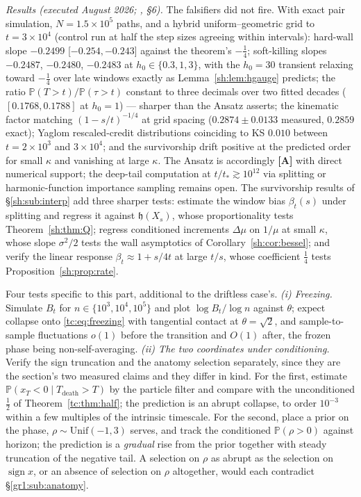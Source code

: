 \documentclass[11pt]{article}
\numberwithin{equation}{section}
\theoremstyle{plain}
\theoremstyle{definition}
\theoremstyle{remark}
\newcommand{\PP}{\mathbb{P}}
\newcommand{\hm}{\mathfrak{h}}
\begin{document}
\emph{Results (executed August 2026; \cite{Ben26Extract}, \S6).} The
falsifiers did not fire. With exact pair simulation,
$N=1.5\times10^{5}$ paths, and a hybrid uniform--geometric grid to
$t=3\times10^{4}$ (control run at half the step sizes agreeing within
intervals): hard-wall slope $-0.2499$ [$-0.254,-0.243$] against the
theorem's $-\tfrac14$; soft-killing slopes $-0.2487$, $-0.2480$,
$-0.2483$ at $h_0\in\{0.3,1,3\}$, with the $h_0=30$ transient
relaxing toward $-\tfrac14$ over late windows exactly as
Lemma~\ref{sh:lem:hgauge} predicts; the ratio
$\PP(T>t)/\PP(\tau>t)$ constant to three decimals over two fitted
decades ($[0.1768,0.1788]$ at $h_0=1$) --- sharper than the Ansatz
asserts; the kinematic factor matching $(1-s/t)^{-1/4}$ at grid
spacing ($0.2874\pm0.0133$ measured, $0.2859$ exact); Yaglom
rescaled-credit distributions coinciding to KS $0.010$ between
$t=2\times10^{3}$ and $3\times10^{4}$; and the survivorship drift
positive at the predicted order for small $\kappa$ and vanishing at
large $\kappa$. The Ansatz is accordingly \textbf{[A]} with direct
numerical support; the deep-tail computation at
$t/t_*\gtrsim10^{12}$ via splitting or harmonic-function importance
sampling remains open. The survivorship results of
\S\ref{sh:sub:interp} add three sharper tests: estimate the window bias
$\beta_t(s)$ under splitting and regress it against $\hm(X_s)$, whose
proportionality tests Theorem~\ref{sh:thm:Q}; regress conditioned
increments $\Delta\mu$ on $1/\mu$ at small $\kappa$, whose slope
$\sigma^2/2$ tests the wall asymptotics of
Corollary~\ref{sh:cor:bessel}; and verify the linear response
$\beta_t\approx1+s/4t$ at large $t/s$, whose coefficient $\tfrac14$ tests
Proposition~\ref{sh:prop:rate}.

\label{tc:sub:numerics}

Four tests specific to this part, additional to the driftless case's. \emph{(i) Freezing.} Simulate $B_t$ for $n\in\{10^{3},10^{4},10^{5}\}$
and plot $\log B_t/\log n$ against $\theta$; expect collapse onto
\eqref{tc:eq:freezing} with tangential contact at $\theta=\sqrt2$, and
sample-to-sample fluctuations $o(1)$ before the transition and $O(1)$
after, the frozen phase being non-self-averaging. \emph{(ii) The two coordinates under conditioning.} Verify the sign
truncation and the anatomy selection separately, since they are the
section's two measured claims and they differ in kind. For the first,
estimate $\PP(x_T<0\mid T_{\text{death}}>T)$ by the particle filter and
compare with the unconditioned $\tfrac12$ of
Theorem~\ref{tc:thm:half}; the prediction is an abrupt collapse, to
order $10^{-3}$ within a few multiples of the intrinsic timescale. For
the second, place a prior on the phase, $\rho\sim
\mathrm{Unif}(-1,3)$ serves, and track the conditioned
$\PP(\rho>0)$ against horizon; the prediction is a \emph{gradual} rise
from the prior together with steady truncation of the negative tail. A
selection on $\rho$ as abrupt as the selection on $\operatorname{sign}
x$, or an absence of selection on $\rho$ altogether, would each
contradict \S\ref{gr1:sub:anatomy}.
\end{document}
